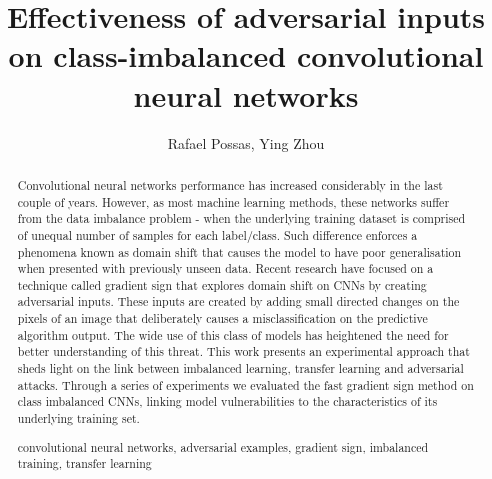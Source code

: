 \documentclass[runningheads,a4paper]{llncs}
\newcommand{\keywords}[1]{\par\addvspace\baselineskip
\noindent\keywordname\enspace\ignorespaces#1}
\begin{document}
\mainmatter  %

\title{Effectiveness of adversarial inputs on class-imbalanced convolutional neural networks}

%
%
\author{Rafael Possas, Ying Zhou}
%


%
%

\maketitle


\begin{abstract}
Convolutional neural networks performance has increased considerably in the last couple of years. However, as most machine learning methods, these networks suffer from the data imbalance problem - when the underlying training dataset is comprised of unequal number of samples for each label/class. Such difference enforces a phenomena known as domain shift that causes the model to have poor generalisation when presented with previously unseen data. Recent research have focused on a technique called gradient sign that explores domain shift on CNNs by creating adversarial inputs. These inputs are created by adding small directed changes on the pixels of an image that deliberately causes a misclassification on the predictive algorithm output. The wide use of this class of models has heightened the need for better understanding of this threat. This work presents an experimental approach that sheds light on the link between imbalanced learning, transfer learning and adversarial attacks. Through a series of experiments we evaluated the fast gradient sign method on class imbalanced CNNs, linking model vulnerabilities to the characteristics of its underlying training set.
\keywords{convolutional neural networks, adversarial examples, gradient sign, imbalanced training, transfer learning}
\end{abstract}
\end{document}
